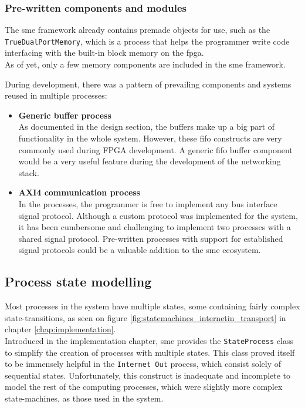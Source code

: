 \subsubsection{Pre-written components and modules}
The \gls{sme} framework already contains premade objects for use, such as the
\texttt{TrueDualPortMemory}, which is a process that helps the programmer write
code interfacing with the built-in block memory on the \gls{fpga}.\\
As of yet, only a few memory components are included in the \gls{sme}
framework.

During development, there was a pattern of prevailing components and systems
reused in multiple processes:
\begin{itemize}
\item \textbf{Generic buffer process}\\
As documented in the design section, the buffers make up a big part of
functionality in the whole system. However, these \gls{fifo} constructs
are very commonly used during FPGA development\cite{fpga_fifo}. A generic
\gls{fifo} buffer component would be a very useful feature during the
development of the networking stack.

\item \textbf{AXI4 communication process}\\
In the processes, the programmer is free to implement any bus interface signal
protocol. Although a custom protocol was implemented for the system, it has
been cumbersome and challenging to implement two processes with a shared signal
protocol. Pre-written processes with support for established signal protocols
could be a valuable addition to the \gls{sme} ecosystem.

\end{itemize}


\subsection{Process state modelling}
Most processes in the system have multiple states, some containing fairly
complex state-transitions, as seen on figure \ref{fig:statemachines_internetin_transport}
in chapter \ref{chap:implementation}.\\
Introduced in the implementation chapter, \gls{sme} provides the
\texttt{StateProcess} class to simplify the creation of processes with
multiple states. This class proved itself to be immensely helpful in the
\texttt{Internet Out} process, which consist solely of sequential states.
Unfortunately, this construct is inadequate and incomplete to model the rest of
the computing processes, which were slightly more complex state-machines, as
those used in the system.

